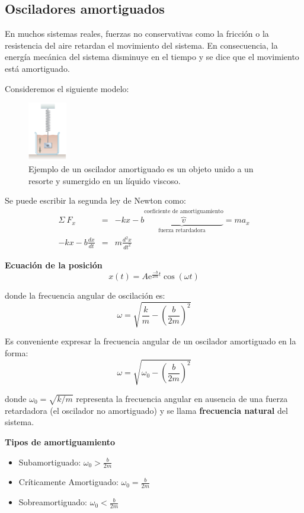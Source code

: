 \subsection{Osciladores amortiguados}

  \PN En muchos sistemas reales, fuerzas no conservativas como la fricción o la resistencia del aire retardan el
  movimiento del sistema. En consecuencia, la energía mecánica del sistema disminuye en el tiempo y se dice que el
  movimiento está amortiguado.

  \vspace{3mm}
  \PN Consideremos el siguiente modelo:

  \begin{figure}[H]
  \centering
    \includegraphics[width=0.15\textwidth]{2/figure_2}
    \caption{Ejemplo de un oscilador amortiguado es un objeto unido a un resorte y sumergido en un líquido viscoso.}
  \end{figure}

  \PN Se puede escribir la segunda ley de Newton como:
  \begin{eqnarray*}
    \Sigma \ F_{x} &=& -kx - \underbrace{b \overbrace{v}^{\text{coeficiente de amortiguamiento}}}_{\text{fuerza retardadora}} = ma_{x} \\
    -kx - b \frac{dx}{dt} &=& m \frac{d^{2}x}{dt^{2}}
  \end{eqnarray*}

  \PN \textbf{Ecuación de la posición}
  \begin{equation}
    x(t) = A \mathrm{e}^{\frac{-b}{2m}t} \cos (\omega t)
  \end{equation}

  \PN donde la frecuencia angular de oscilación es:
  \begin{equation}
    \omega = \sqrt{\frac{k}{m} - \left(\frac{b}{2m}\right)^{2}}
  \end{equation}

  \PN Es conveniente expresar la frecuencia angular de un oscilador amortiguado en la forma:
  \begin{equation}
    \omega = \sqrt{\omega_{0} - \left(\frac{b}{2m}\right)^{2}}
  \end{equation}

  \PN donde $\omega_{0} = \sqrt{k/m}$ representa la frecuencia angular en ausencia de una fuerza retardadora (el
  oscilador no amortiguado) y se llama \textbf{frecuencia natural} del sistema.

  \pagebreak
  \PN \textbf{Tipos de amortiguamiento}
  \begin{itemize}
    \item Subamortiguado: $\omega_{0} > \frac{b}{2m}$
    \item Críticamente Amortiguado: $\omega_{0} = \frac{b}{2m}$
    \item Sobreamortiguado: $\omega_{0} < \frac{b}{2m}$
  \end{itemize}
